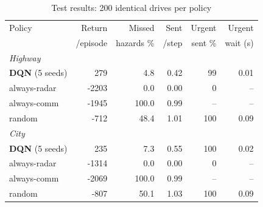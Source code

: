 \begin{table}[t]
\caption{Test results: 200 identical drives per policy}
\label{tab:res}
\centering\footnotesize
\setlength{\tabcolsep}{3pt}
\begin{tabular}{lrrrrr}
\toprule
Policy & Return & Missed & Sent & Urgent & Urgent \\
 & /episode & hazards \% & /step & sent \% & wait (s) \\
\midrule
\multicolumn{6}{l}{\emph{Highway}}\\
\textbf{DQN} (5 seeds) & 279 & 4.8 & 0.42 & 99 & 0.01\\
always-radar & -2203 & 0.0 & 0.00 & 0 & --\\
always-comm & -1945 & 100.0 & 0.99 & -- & --\\
random & -712 & 48.4 & 1.01 & 100 & 0.09\\
\multicolumn{6}{l}{\emph{City}}\\
\textbf{DQN} (5 seeds) & 235 & 7.3 & 0.55 & 100 & 0.02\\
always-radar & -1314 & 0.0 & 0.00 & 0 & --\\
always-comm & -2069 & 100.0 & 0.99 & -- & --\\
random & -807 & 50.1 & 1.03 & 100 & 0.09\\
\bottomrule
\end{tabular}
\end{table}
